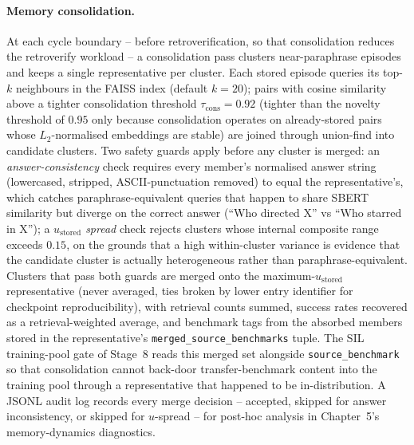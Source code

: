 \paragraph{Memory consolidation.}
At each cycle boundary -- before retroverification, so that consolidation reduces the retroverify workload -- a consolidation pass clusters near-paraphrase episodes and keeps a single representative per cluster. Each stored episode queries its top-$k$ neighbours in the FAISS index (default $k = 20$); pairs with cosine similarity above a tighter consolidation threshold $\tau_{\text{cons}} = 0.92$ (tighter than the novelty threshold of $0.95$ only because consolidation operates on already-stored pairs whose $L_{2}$-normalised embeddings are stable) are joined through union-find into candidate clusters. Two safety guards apply before any cluster is merged: an \emph{answer-consistency} check requires every member's normalised answer string (lowercased, stripped, ASCII-punctuation removed) to equal the representative's, which catches paraphrase-equivalent queries that happen to share SBERT similarity but diverge on the correct answer (``Who directed X'' vs ``Who starred in X''); a \emph{$u_{\text{stored}}$ spread} check rejects clusters whose internal composite range exceeds $0.15$, on the grounds that a high within-cluster variance is evidence that the candidate cluster is actually heterogeneous rather than paraphrase-equivalent. Clusters that pass both guards are merged onto the maximum-$u_{\text{stored}}$ representative (never averaged, ties broken by lower entry identifier for checkpoint reproducibility), with retrieval counts summed, success rates recovered as a retrieval-weighted average, and benchmark tags from the absorbed members stored in the representative's \texttt{merged\_source\_benchmarks} tuple. The SIL training-pool gate of Stage~8 reads this merged set alongside \texttt{source\_benchmark} so that consolidation cannot back-door transfer-benchmark content into the training pool through a representative that happened to be in-distribution. A JSONL audit log records every merge decision -- accepted, skipped for answer inconsistency, or skipped for $u$-spread -- for post-hoc analysis in Chapter~5's memory-dynamics diagnostics.

